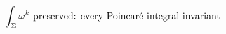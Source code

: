 \documentclass[preview]{standalone}
\begin{document}
\begin{align*}
\special{dvisvgm:raw <g id='unique000'>}\int_\Sigma\omega^k\ \text{preserved: every Poincaré integral invariant}\special{dvisvgm:raw </g>}
\end{align*}
\end{document}
